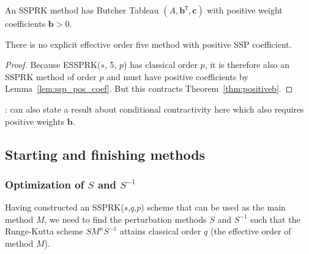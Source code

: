 \begin{lem}\label{lem:ssp_pos_coef}\cite{Ruuth2002}
  An SSPRK method
  has Butcher Tableau \( (A,\textbf{b}^{\texttt{T}},\textbf{c}) \) with positive weight coefficients \( \textbf{b} > 0 \).
\end{lem}

\begin{theorem}\label{thm:noESSP5}
There is no explicit effective order five method with positive SSP coefficient.
\end{theorem}

\begin{proof}
  Because ESSPRK($s$, 5, $p$) has classical order $p$, it is therefore
  also an SSPRK method of order $p$ and must have positive coefficients
  by Lemma~\ref{lem:ssp_pos_coef}.  But this contracts
  Theorem~\ref{thm:positiveb}.
\end{proof}


\begin{result}
  : can also state a result about conditional contractivity here
  which also requires positive weights $\textbf{b}$.
\end{result}



\subsection{Starting and finishing methods}\label{subsection3.2}


\subsubsection{Optimization of $ S $ and $ S^{-1} $}\label{subsection3.2.1}

Having constructed an SSPRK(\( s \),\( q \),\( p \)) scheme that can
be used as the main method \( M \), we need to find the perturbation
methods \( S \) and \( S^{-1} \) such that the Runge-Kutta scheme \(
SM^{n}S^{-1} \) attains classical order $q$ (the effective order of
method \( M \)).

